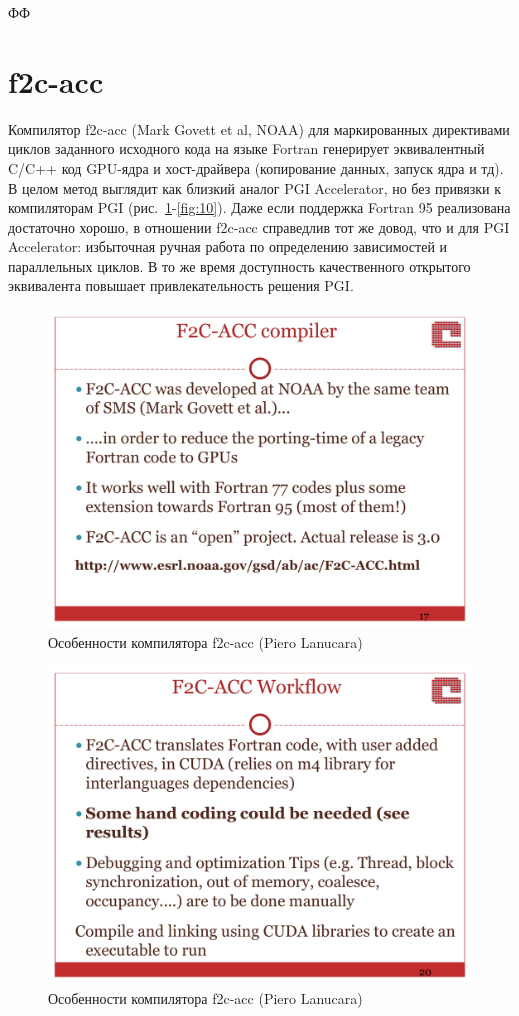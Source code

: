 \documentclass[a4,12pt]{report}
\begin{document}
ФФ

\section{f2c-acc}

Компилятор f2c-acc (Mark Govett et al, NOAA) для маркированных директивами циклов заданного исходного кода на языке Fortran генерирует эквивалентный C/C++ код GPU-ядра и хост-драйвера (копирование данных, запуск ядра и тд). В целом метод выглядит как близкий аналог PGI Accelerator, но без привязки к компиляторам PGI (рис.~\ref{fig:08}-\ref{fig:10}). Даже если поддержка Fortran 95 реализована достаточно хорошо, в отношении f2c-acc справедлив тот же довод, что и для PGI Accelerator: избыточная ручная работа по определению зависимостей и параллельных циклов. В то же время доступность качественного открытого эквивалента повышает привлекательность решения PGI.

\begin{figure}
\centering
\includegraphics[scale=0.4]{slides/08.pdf}
\caption{Особенности компилятора f2c-acc (Piero Lanucara)}
\label{fig:08}
\end{figure}

\begin{figure}
\centering
\includegraphics[scale=0.4]{slides/09.pdf}
\caption{Особенности компилятора f2c-acc (Piero Lanucara)}
\label{fig:09}
\end{figure}
\end{document}
